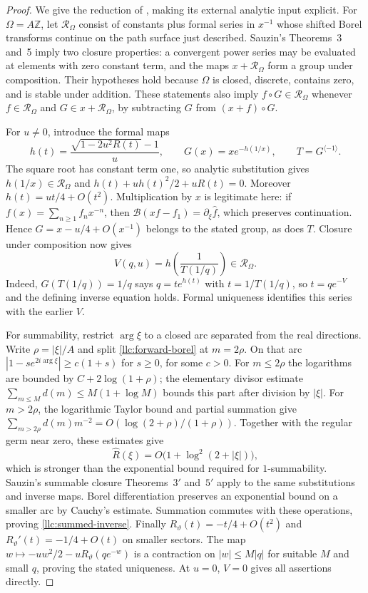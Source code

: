 \begin{proof}
We give the reduction of \cite{llc:continuation}, making its external
analytic input explicit. For $\Omega=A\mathbb Z$, let
$\mathcal R_\Omega$ consist of constants plus formal series in $x^{-1}$
whose shifted Borel transforms continue on the path surface just
described. Sauzin's Theorems~3 and~5 \cite{llc:sauzin} imply two closure
properties: a convergent power series may be evaluated at elements
with zero constant term, and the maps $x+\mathcal R_\Omega$ form a
group under composition. Their hypotheses hold because $\Omega$ is
closed, discrete, contains zero, and is stable under addition.
These statements also imply $f\circ G\in\mathcal R_\Omega$ whenever
$f\in\mathcal R_\Omega$ and $G\in x+\mathcal R_\Omega$, by subtracting
$G$ from $(x+f)\circ G$.

For $u\ne0$, introduce the formal maps
\begin{equation}\label{llc:continuation-parametrization}
 h(t)=\frac{\sqrt{1-2u^2R(t)}-1}{u},\qquad
 G(x)=x e^{-h(1/x)},\qquad T=G^{\langle-1\rangle}.
\end{equation}
The square root has constant term one, so analytic substitution gives
$h(1/x)\in\mathcal R_\Omega$ and
$h(t)+uh(t)^2/2+uR(t)=0$. Moreover $h(t)=ut/4+O(t^2)$.
Multiplication by $x$ is legitimate here: if
$f(x)=\sum_{n\ge1}f_nx^{-n}$, then
$\mathcal B(xf-f_1)=\partial_\xi\widehat f$, which preserves continuation.
Hence $G=x-u/4+O(x^{-1})$ belongs to the stated group, as does $T$.
Closure under composition now gives
\[
 V(q,u)=h\!\left(\frac1{T(1/q)}\right)\in\mathcal R_\Omega.
\]
Indeed, $G(T(1/q))=1/q$ says $q=t e^{h(t)}$ with
$t=1/T(1/q)$, so $t=qe^{-V}$ and the defining inverse equation holds.
Formal uniqueness identifies this series with the earlier $V$.

For summability, restrict $\arg\xi$ to a closed arc separated from
the real directions. Write $\rho=|\xi|/A$ and split
\eqref{llc:forward-borel} at $m=2\rho$. On that arc
$|1-se^{2i\arg\xi}|\ge c(1+s)$ for $s\ge0$, for some $c>0$.
For $m\le2\rho$ the logarithms are bounded by
$C+2\log(1+\rho)$; the elementary divisor estimate
$\sum_{m\le M}d(m)\le M(1+\log M)$ bounds this part after division by
$|\xi|$. For $m>2\rho$, the logarithmic Taylor bound and partial
summation give
$\sum_{m>2\rho}d(m)m^{-2}=O(\log(2+\rho)/(1+\rho))$.
Together with the regular germ near zero, these estimates give
\[
 \widehat R(\xi)=O\bigl(1+\log^2(2+|\xi|)\bigr),
\]
which is stronger than the exponential bound required for $1$-summability.
Sauzin's summable closure Theorems~$3'$ and~$5'$ apply to the same
substitutions and inverse maps. Borel differentiation preserves an
exponential bound on a smaller arc by Cauchy's estimate. Summation
commutes with these operations, proving \eqref{llc:summed-inverse}.
Finally $R_\vartheta(t)=-t/4+O(t^2)$ and
$R_\vartheta'(t)=-1/4+O(t)$ on smaller sectors. The map
$w\mapsto-uw^2/2-uR_\vartheta(qe^{-w})$ is a contraction on
$|w|\le M|q|$ for suitable $M$ and small $q$, proving the stated
uniqueness. At $u=0$, $V=0$ gives all assertions directly.
\end{proof}

